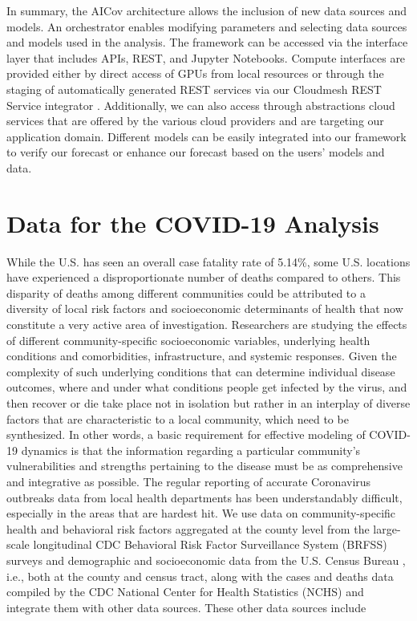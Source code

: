\documentclass[letterpaper, inpress]{jds} %
\renewcommand{\_}{%
    \textunderscore\hspace{0pt}%
}
\begin{document}
In summary, the AICov architecture allows the inclusion of new data
sources and models. An orchestrator enables modifying parameters and
selecting data sources and models used in the analysis. The framework
can be accessed via the interface layer that includes APIs, REST, and
Jupyter Notebooks. Compute interfaces are provided either by direct
access of GPUs from local resources or through the staging of
automatically generated REST services via our Cloudmesh REST Service
integrator
\citep{cloudmesh-openapi-install,cloudmesh-openapi-benchmark,cloudmesh-manual}.
Additionally, we can also access through abstractions cloud services
that are offered by the various cloud providers and are targeting our
application domain. Different models can be easily integrated into our
framework to verify our forecast or enhance our forecast based on the
users' models and data.

\section{Data for the COVID-19 Analysis}
\label{sec:data}


While the U.S. has seen an overall case fatality rate of 5.14\%, some
U.S. locations have experienced a disproportionate number of deaths
compared to others. This disparity of deaths among different
communities could be attributed to a diversity of local risk factors
and socioeconomic determinants of health that now constitute a very
active area of investigation. Researchers are studying the effects of
different community-specific socioeconomic variables, underlying
health conditions and comorbidities, infrastructure, and systemic
responses.  Given the complexity of such underlying conditions that
can determine individual disease outcomes, where and under what
conditions people get infected by the virus, and then recover or die
take place not in isolation but rather in an interplay of diverse
factors that are characteristic to a local community, which need to be
synthesized. In other words, a basic requirement for effective
modeling of COVID-19 dynamics is that the information regarding a
particular community’s vulnerabilities and strengths pertaining to the
disease must be as comprehensive and integrative as possible.  The
regular reporting of accurate Coronavirus outbreaks data from local
health departments has been understandably difficult, especially in
the areas that are hardest hit.
%
 We use data on community-specific health and
behavioral risk factors aggregated at the county level from the
large-scale longitudinal CDC Behavioral Risk Factor Surveillance
System (BRFSS) surveys \citep{www-cdc-brfss} and demographic and
socioeconomic data from the U.S. Census Bureau \cite{www-sensus},
i.e., both at the county and census tract, along with the cases and
deaths data compiled by the CDC National Center for Health Statistics
(NCHS) \citep{www-cdc-nchs} and integrate them with other data
sources. These other data sources include
\end{document}
